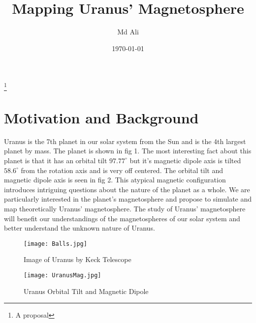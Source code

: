 \documentclass[%
 reprint,
 amsmath,amssymb,
 aps,
]{revtex4-1}
\begin{document}

\title{Mapping Uranus' Magnetosphere}%
\thanks{A proposal}%

\author{Md Ali}
%


\date{\today}%

\maketitle


\section{\label{sec:level1}Motivation and Background}

Uranus is the 7th planet in our solar system from the Sun and is the 4th largest planet by mass. The planet is shown in fig 1. The most interesting fact about this planet is that it has an orbital tilt $97.77^\circ$ but it's magnetic dipole axis is tilted $58.6^\circ$ from the rotation axis and is very off centered. The orbital tilt and magnetic dipole axis is seen in fig 2. This atypical magnetic configuration introduces intriguing questions about the nature of the planet as a whole. We are particularly interested in the planet's magnetosphere and propose to simulate and map theoretically Uranus' magnetosphere. The study of Uranus' magnetosphere will benefit our understandings of the magnetospheres of our solar system and better understand the unknown nature of Uranus.

\begin{figure}[htbp] %
   \centering
   \texttt{[image: Balls.jpg]} 
   \caption{Image of Uranus by Keck Telescope}
   \label{fig:example}
\end{figure}

\begin{figure}[htbp] %
   \centering
   \texttt{[image: UranusMag.jpg]} 
   \caption{Uranus Orbital Tilt and Magnetic Dipole}
   \label{fig:example}
\end{figure}
\end{document}
